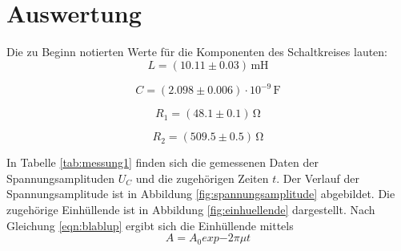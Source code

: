 \section{Auswertung}
\label{sec:Auswertung}
Die zu Beginn notierten Werte für die Komponenten des Schaltkreises lauten:
\begin{equation*}
  L=(10.11 \pm 0.03) \,\si{\milli\henry}
\end{equation*}

\begin{equation*}
C=(2.098 \pm 0.006) \cdot 10^{-9} \, \si{\farad}
\end{equation*}

\begin{equation*}
R_\text{1}= (48.1 \pm 0.1) \, \si{\ohm}
\end{equation*}

\begin{equation*}
R_\text{2}= (509.5\pm 0.5)\,\si{\ohm}
\end{equation*}


In Tabelle \ref{tab:messung1} finden sich die gemessenen Daten der Spannungsamplituden $U_C$ und die zugehörigen Zeiten $t$.
Der Verlauf der Spannungsamplitude ist in Abbildung \ref{fig:spannungsamplitude} abgebildet. Die zugehörige Einhüllende ist in Abbildung \ref{fig:einhuellende} dargestellt.
Nach Gleichung \eqref{eqn:blablup} ergibt sich die Einhüllende mittels
\begin{equation}
A=A_\text{0}exp{-2 \pi \mu t}
\end{equation}
